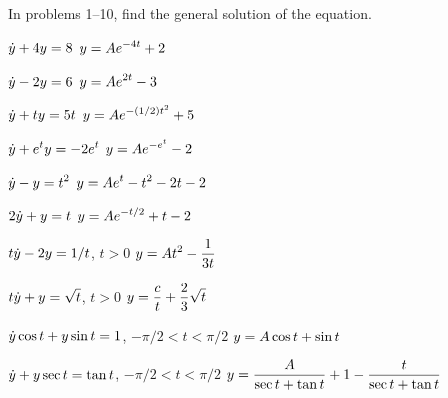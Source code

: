 \exercises

In problems 1--10, find the general solution of the equation.

\exercise $\displaystyle\dot y +4y=8$
\answer $\displaystyle y=Ae^{-4t}+2$
\endanswer
\endexercise

\exercise $\displaystyle\dot y-2y=6$
\answer $\displaystyle y=Ae^{2t}-3$
\endanswer
\endexercise

\exercise $\displaystyle\dot y +ty=5t$
\answer $\displaystyle y=Ae^{-(1/2)t^2}+5$
\endanswer
\endexercise

\exercise $\displaystyle\dot y+e^ty=-2e^t$
\answer $\displaystyle y=Ae^{-e^t}-2$
\endanswer
\endexercise

\exercise $\displaystyle\dot y-y=t^2$
\answer $\displaystyle y=Ae^{t}-t^2-2t-2$
\endanswer
\endexercise

\exercise $\displaystyle 2\dot y +y=t$
\answer $\displaystyle y=Ae^{-t/2}+t-2$
\endanswer
\endexercise

\exercise $\displaystyle t\dot y -2y=1/t$, $t>0$
\answer $\displaystyle y=At^2-{1\over3t}$
\endanswer
\endexercise

\exercise $\displaystyle t\dot y+y=\sqrt{t}$, $t>0$
\answer $\displaystyle y={c\over t}+{2\over3}\sqrt t$
\endanswer
\endexercise

\exercise $\displaystyle\dot y\cos t+y\sin t=1$, $-\pi/2<t<\pi/2$
\answer $\displaystyle y= A\cos t+\sin t$
\endanswer
\endexercise

\exercise $\displaystyle\dot y + y\sec t=\tan t$, $-\pi/2<t<\pi/2$
\answer $\displaystyle y= {A\over\sec t+\tan t}+1-{t\over\sec t+\tan t}$
\endanswer
\endexercise

\endexercises
